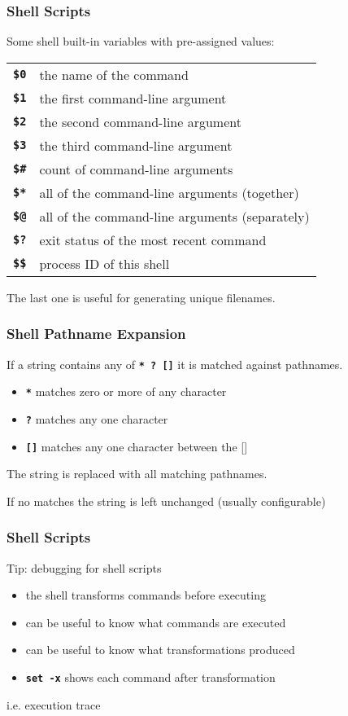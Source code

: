 \begin{frame}
\frametitle{Shell Scripts}
Some shell built-in variables with pre-assigned values:
\begin{center}
\begin{tabular}{ll}
 \textbf{\tt{\$0}}  &   the name of the command  \\
 \textbf{\tt{\$1}}  &   the first command-line argument  \\
 \textbf{\tt{\$2}}  &   the second command-line argument  \\
 \textbf{\tt{\$3}}  &   the third command-line argument  \\
 \textbf{\tt{\$\#}}  &   count of command-line arguments  \\
 \textbf{\tt{\$*}}  &   all of the command-line arguments (together) \\
 \textbf{\tt{\$@}}  &   all of the command-line arguments (separately) \\
 \textbf{\tt{\$?}}  &   exit status of the most recent command \\
 \textbf{\tt{\$\$}}  &   process ID of this shell \\
\end{tabular}
\end{center}
The last one is useful for generating unique filenames.
\end{frame}

\begin{frame}
\frametitle{Shell Pathname Expansion}

If a string contains any of  \textbf{\tt{* ? []}}
it is  matched against pathnames.

\begin{itemize}
\item  \textbf{\tt{*}} matches zero or more of any character
\item  \textbf{\tt{?}} matches  any  one character
\item  \textbf{\tt{[]}} matches  any  one character between the []
\end{itemize}

The string is replaced with all matching pathnames.

If no matches the string is left unchanged (usually configurable)
\end{frame}

\begin{frame}
\frametitle{Shell Scripts}
Tip: debugging for shell scripts
\begin{itemize}
\item  the shell transforms commands before executing
\item  can be useful to know what commands are executed
\item  can be useful to know what transformations produced
\item  \textbf{\tt{set -x}} shows each command after transformation
\end{itemize}
i.e. execution trace
\end{frame}

